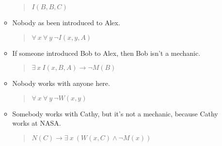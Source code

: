 \documentclass{article}
\begin{document}
\begin{enumerate}
\begin{itemize}
\begin{quote}
$I(B, B, C)$
\end{quote}
\item Nobody as been introduced to Alex.
\begin{quote}
$\forall\ x\ \forall\ y\ \neg I(x, y, A)$
\end{quote}
\item If someone introduced Bob to Alex, then Bob isn't a mechanic.
\begin{quote}
$\exists\ x\ I(x, B, A) \rightarrow \neg M(B)$
\end{quote}
\item Nobody works with anyone here.
\begin{quote}
$\forall\ x\ \forall\ y\ \neg W(x, y)$
\end{quote}
\item Somebody works with Cathy, but it's not a mechanic, because Cathy works at NASA.
\begin{quote}
$N(C) \rightarrow \exists\ x\ (W(x, C) \wedge \neg M(x))$
\end{quote}
\end{itemize}
\end{enumerate}
\end{document}
